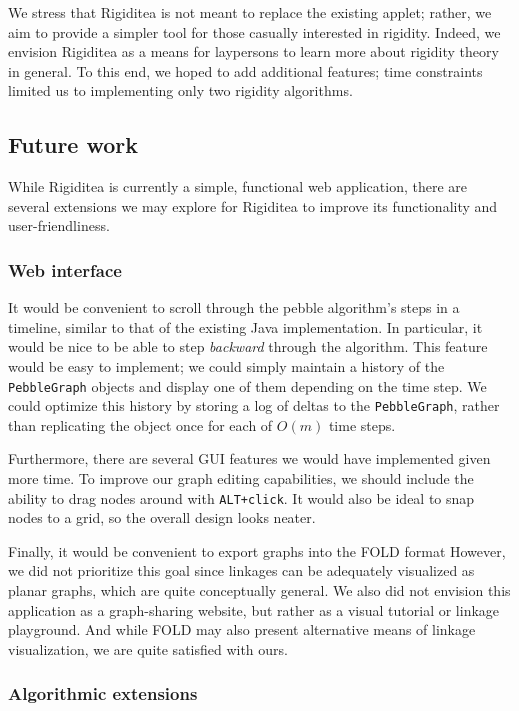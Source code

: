 \documentclass[aps,prd,final,twocolumn,letterpaper,nofootinbib]{revtex4-1}
\begin{document}
We stress that Rigiditea is not meant to replace the existing applet;
rather, we aim to provide a simpler tool
for those casually interested in rigidity.
Indeed, we envision Rigiditea as a means for laypersons
to learn more about rigidity theory in general.
To this end, we hoped to add additional features;
time constraints limited us to implementing only two rigidity algorithms.

\subsection{Future work}

While Rigiditea is currently a simple, functional web application,
there are several extensions we may explore for Rigiditea
to improve its functionality and user-friendliness.

\subsubsection{Web interface}

It would be convenient to scroll through the pebble algorithm's steps
in a timeline, similar to that of the existing Java implementation.
In particular, it would be nice to be able to step \emph{backward}
through the algorithm.
This feature would be easy to implement;
we could simply maintain a history of the \texttt{PebbleGraph} objects
and display one of them depending on the time step.
We could optimize this history by storing a log
of deltas to the \texttt{PebbleGraph},
rather than replicating the object once for each of $O(m)$ time steps.

Furthermore, there are several GUI features
we would have implemented given more time.
To improve our graph editing capabilities,
we should include the ability to drag nodes around with \texttt{ALT+click}.
It would also be ideal to snap nodes to a grid,
so the overall design looks neater.

Finally, it would be convenient to export graphs into the FOLD format
However, we did not prioritize this goal since
linkages can be adequately visualized as planar graphs,
which are quite conceptually general.
We also did not envision this application as a graph-sharing website,
but rather as a visual tutorial or linkage playground.
And while FOLD may also present alternative means of linkage visualization,
we are quite satisfied with ours.

\subsubsection{Algorithmic extensions}
\end{document}
